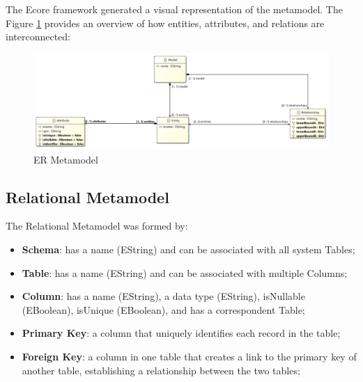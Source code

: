 \documentclass[10pt]{article}
\begin{document}
The Ecore framework generated a visual representation of the metamodel. The Figure \ref{figure3} provides an overview of how entities, attributes, and relations are interconnected:

\begin{center}
    \begin{figure}[H]
        \centering
        \includegraphics[width=1.0\textwidth]{imgs/er-metamodel.jpeg}
            \caption{ER Metamodel}
        \label{figure3}
    \end{figure}
\end{center}

\subsection{Relational Metamodel}

The Relational Metamodel was formed by:

\begin{itemize}

    \item \textbf{Schema}: has a name (EString) and can be associated with all system Tables;
 
    \item \textbf{Table}: has a name (EString) and can be associated with multiple Columns;
    
    \item \textbf{Column}: has a name (EString), a data type (EString), isNullable (EBoolean), isUnique (EBoolean), and has a correspondent Table;
    
    \item \textbf{Primary Key}: a column that uniquely identifies each record in the table;
    
    \item \textbf{Foreign Key}: a column in one table that creates a link to the primary key of another table, establishing a relationship between the two tables;
    
\end{itemize}
\end{document}

